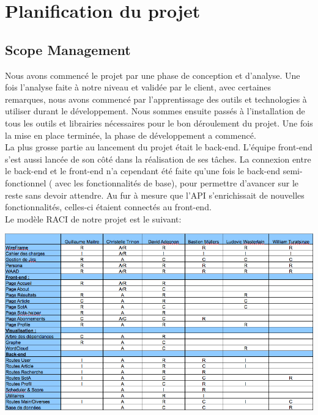 \documentclass[t, 12pt, usenames,dvipsnames]{article}
\begin{document}
    
    
    \newpage
    
    \section{Planification du projet}
        \subsection{Scope Management}
        \noindent Nous avons commencé le projet par une phase de conception et d'analyse. Une fois l'analyse faite à notre niveau et validée par le client, avec certaines remarques, nous avons commencé par l'apprentissage des outils et technologies à utiliser durant le développement. Nous sommes ensuite passés à l'installation de tous les outils et librairies nécessaires pour le bon déroulement du projet. Une fois la mise en place terminée, la phase de développement a commencé.\\
        La plus grosse partie au lancement du projet était le back-end. L'équipe front-end s'est aussi lancée de son côté dans la réalisation de ses tâches. La connexion entre le back-end et le front-end n'a cependant été faite qu'une fois le back-end semi-fonctionnel ( avec les fonctionnalités de base), pour permettre d'avancer sur le reste sans devoir attendre. Au fur à mesure que l'API s'enrichissait de nouvelles fonctionnalités, celles-ci étaient connectés au front-end.\\
        Le modèle RACI de notre projet est le suivant:
        \begin{center}
            \includegraphics[scale=.5]{images/RACI.png}
            \label{fig:modele_raci}
        \end{center}
            
\end{document}
